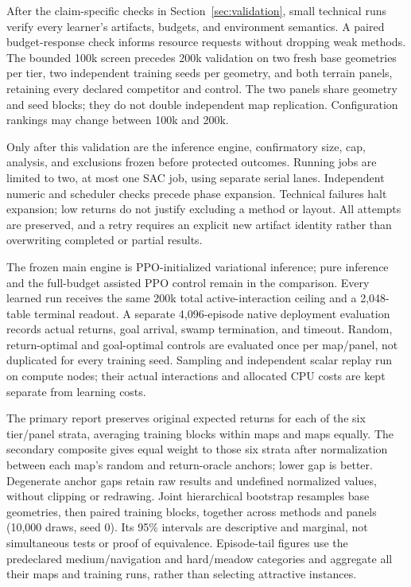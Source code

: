 
After the claim-specific checks in Section~\ref{sec:validation}, small
technical runs verify every learner's artifacts, budgets, and environment
semantics. A paired budget-response check informs resource requests without
dropping weak methods. The bounded 100k screen precedes 200k validation on
two fresh base geometries per tier, two independent training seeds per geometry,
and both terrain panels, retaining every declared competitor and control.
The two panels share geometry and seed blocks; they do not double independent
map replication. Configuration rankings may change between 100k and 200k.

Only after this validation are the inference engine, confirmatory size, cap,
analysis, and exclusions frozen before protected outcomes. Running jobs are
limited to two, at most one SAC job, using separate serial lanes. Independent
numeric and scheduler checks precede phase expansion. Technical failures halt
expansion; low returns do not justify excluding a method or layout. All attempts
are preserved, and a retry requires an explicit new artifact identity rather
than overwriting completed or partial results.

The frozen main engine is PPO-initialized variational inference; pure inference
and the full-budget assisted PPO control remain in the comparison. Every
learned run receives the same 200k total active-interaction ceiling and a
2,048-table terminal readout. A separate 4,096-episode native deployment
evaluation records actual returns, goal arrival, swamp termination, and timeout.
Random, return-optimal and goal-optimal controls are evaluated once per
map/panel, not duplicated for every training seed. Sampling and independent
scalar replay run on compute nodes; their actual interactions and allocated
CPU costs are kept separate from learning costs.

The primary report preserves original expected returns for each of the six
tier/panel strata, averaging training blocks within maps and maps equally.
The secondary composite gives equal weight to those six strata after
normalization between each map's random and return-oracle anchors; lower gap
is better. Degenerate anchor gaps retain raw results and undefined normalized
values, without clipping or redrawing. Joint hierarchical bootstrap resamples
base geometries, then paired training blocks, together across methods and
panels (10,000 draws, seed 0). Its 95\% intervals are descriptive and marginal,
not simultaneous tests or proof of equivalence. Episode-tail figures use the
predeclared medium/navigation and hard/meadow categories and aggregate all
their maps and training runs, rather than selecting attractive instances.

